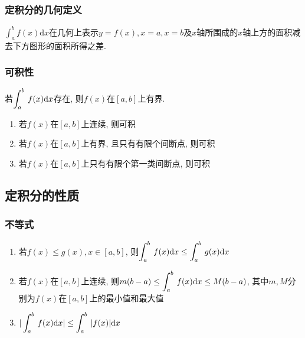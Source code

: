 \subsubsection{定积分的几何定义}
$ \displaystyle\int_{a}^{b}f(x)\mathrm{d}x $在几何上表示$ y=f(x), x=a, x=b $及$ x $轴所围成的$ x $轴上方的面积减去下方图形的面积所得之差.
\subsubsection{可积性}
\par \vspace{.5em}
若$ \displaystyle\int_{a}^{b}\hspace{.2em}f(x)\mathrm{d}x $存在, 则$ f(x) $在$ [a,b] $上有界.\par \vspace{.5em}
\begin{enumerate}
\item 若$ f(x) $在$ [a,b] $上连续, 则可积
\item 若$ f(x) $在$ [a,b] $上有界, 且只有有限个间断点, 则可积
\item 若$ f(x) $在$ [a,b] $上只有有限个第一类间断点, 则可积
\end{enumerate}
\subsection{定积分的性质}
\subsubsection{不等式}
\begin{enumerate}
\item 若$ f(x)\le g(x), x\in[a,b] $, 则$ \displaystyle\int_{a}^{b}\hspace{.2em}f(x)\mathrm{d}x\le \displaystyle\int_{a}^{b}\hspace{.2em}g(x)\mathrm{d}x $
\item 若$ f(x) $在$ [a,b] $上连续, 则$ m(b-a)\le \displaystyle\int_{a}^{b}\hspace{.2em}f(x)\mathrm{d}x\le M(b-a) $, 其中$ m,M $分别为$ f(x) $在$ [a,b] $上的最小值和最大值
\item $ |\displaystyle\int_{a}^{b}\hspace{.2em}f(x)\mathrm{d}x|\le \displaystyle\int_{a}^{b}\hspace{.2em}|f(x)|\mathrm{d}x $
\end{enumerate}
